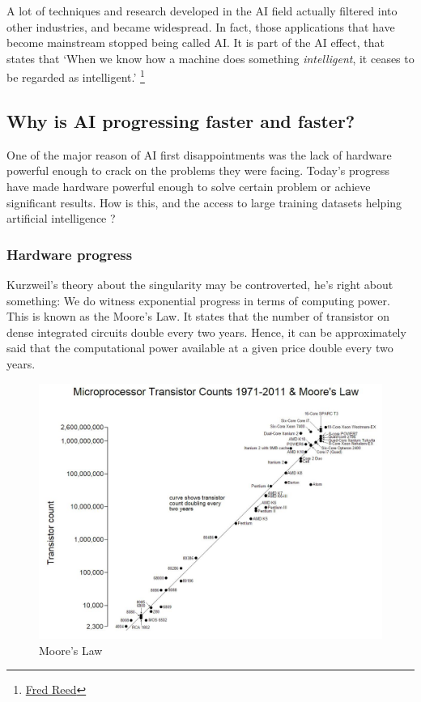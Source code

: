 \documentclass[12pt]{article}
\begin{document}
A lot of techniques and research developed in the AI field actually filtered
into  other industries, and became widespread. In fact, those applications that
have become  mainstream stopped being called AI. It is part of the AI effect,
that states that \lq When we know how a machine does something {\em
intelligent}, it ceases to be regarded as intelligent.\rq
\footnote{\href{http://www.washingtontimes.com/news/2006/apr/13/20060413-105217-7645r/}
{Fred Reed}}

\pagebreak

\subsection{Why is AI progressing faster and faster?}

One of the major reason of AI first disappointments was the lack of hardware
powerful  enough to crack on the problems they were facing. Today's progress
have made hardware powerful enough to solve certain problem or achieve
significant results. How is this, and the  access to large training datasets
helping artificial intelligence ?

\subsubsection{Hardware progress}

Kurzweil's theory about the singularity may be controverted, he's right about
something: We do witness exponential progress in terms of computing power. This
is known as the Moore's Law. It states that the number of transistor on dense
integrated circuits double every two years. Hence, it can be approximately said
that the computational power available at a given price double every two years.

\begin{figure}[ht]
    \centering
    \includegraphics[width=\textwidth]{moore}
    \caption{Moore's Law}
    \label{fig:moore}
\end{figure}
\end{document}
